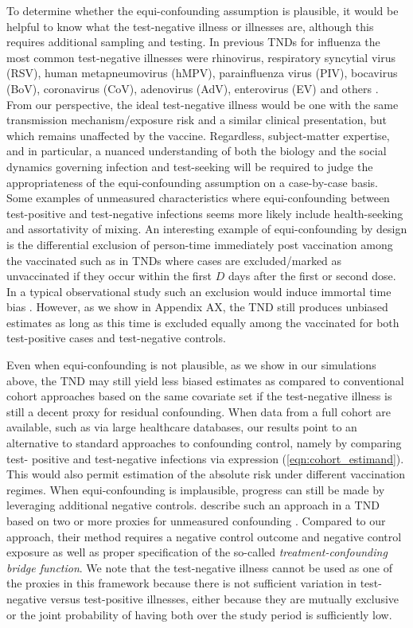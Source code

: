 \documentclass[11pt]{article}
\begin{document}
To determine whether the equi-confounding assumption is plausible, it would be helpful to know what the test-negative illness or illnesses are, although this requires additional sampling and testing. In previous TNDs for influenza the most common test-negative illnesses were rhinovirus, respiratory syncytial virus (RSV), human metapneumovirus (hMPV), parainfluenza virus (PIV), bocavirus (BoV), coronavirus (CoV), adenovirus (AdV), enterovirus (EV) and others \cite{chua_use_2020-1}. From our perspective, the ideal test-negative illness would be one with the same transmission mechanism/exposure risk and a similar clinical presentation, but which remains unaffected by the vaccine. Regardless, subject-matter expertise, and in particular, a nuanced understanding of both the biology and the social dynamics governing infection and test-seeking will be required to judge the appropriateness of the equi-confounding assumption on a case-by-case basis. Some examples of unmeasured characteristics where equi-confounding between test-positive and test-negative infections seems more likely include health-seeking and assortativity of mixing. An interesting example of equi-confounding by design is the differential exclusion of person-time immediately post vaccination among the vaccinated such as in TNDs where cases are excluded/marked as unvaccinated if they occur within the first $D$ days after the first or second dose. In a typical observational study such an exclusion would induce immortal time bias \cite{suissa_immortal_2008}. However, as we show in Appendix AX, the TND still produces unbiased estimates as long as this time is excluded equally among the vaccinated for both test-positive cases and test-negative controls. 

Even when equi-confounding is not plausible, as we show in our simulations above, the TND may still yield less biased estimates as compared to conventional cohort approaches based on the same covariate set if the test-negative illness is still a decent proxy for residual confounding. When data from a full cohort are available, such as via large healthcare databases, our results point to an alternative to standard approaches to confounding control, namely by comparing test- positive and test-negative infections via expression (\ref{eqn:cohort_estimand}). This would also permit estimation of the absolute risk under different vaccination regimes. When equi-confounding is implausible, progress can still be made by leveraging additional negative controls. \citeauthor{li_double_2023} describe such an approach in a TND based on two or more proxies for unmeasured confounding \cite{li_double_2023}. Compared to our approach, their method requires a negative control outcome and negative control exposure as well as proper specification of the so-called \textit{treatment-confounding bridge function}. We note that the test-negative illness cannot be used as one of the proxies in this framework because there is not sufficient variation in test-negative versus test-positive illnesses, either because they are mutually exclusive or the joint probability of having both over the study period is sufficiently low.
\end{document}
